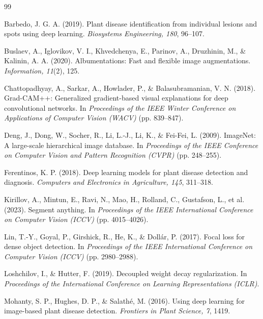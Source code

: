 \documentclass[final,5p,times,twocolumn,authoryear]{elsarticle}
\begin{document}
\begin{thebibliography}{99}

Barbedo, J. G. A. (2019). Plant disease identification from individual lesions and spots using deep learning. \textit{Biosystems Engineering, 180}, 96--107.

Buslaev, A., Iglovikov, V. I., Khvedchenya, E., Parinov, A., Druzhinin, M., \& Kalinin, A. A. (2020). Albumentations: Fast and flexible image augmentations. \textit{Information, 11}(2), 125.

Chattopadhyay, A., Sarkar, A., Howlader, P., \& Balasubramanian, V. N. (2018). Grad-CAM++: Generalized gradient-based visual explanations for deep convolutional networks. In \textit{Proceedings of the IEEE Winter Conference on Applications of Computer Vision (WACV)} (pp. 839--847).

Deng, J., Dong, W., Socher, R., Li, L.-J., Li, K., \& Fei-Fei, L. (2009). ImageNet: A large-scale hierarchical image database. In \textit{Proceedings of the IEEE Conference on Computer Vision and Pattern Recognition (CVPR)} (pp. 248--255).

Ferentinos, K. P. (2018). Deep learning models for plant disease detection and diagnosis. \textit{Computers and Electronics in Agriculture, 145}, 311--318.

Kirillov, A., Mintun, E., Ravi, N., Mao, H., Rolland, C., Gustafson, L., et al. (2023). Segment anything. In \textit{Proceedings of the IEEE International Conference on Computer Vision (ICCV)} (pp. 4015--4026).

Lin, T.-Y., Goyal, P., Girshick, R., He, K., \& Doll\'{a}r, P. (2017). Focal loss for dense object detection. In \textit{Proceedings of the IEEE International Conference on Computer Vision (ICCV)} (pp. 2980--2988).

Loshchilov, I., \& Hutter, F. (2019). Decoupled weight decay regularization. In \textit{Proceedings of the International Conference on Learning Representations (ICLR)}.

Mohanty, S. P., Hughes, D. P., \& Salath\'{e}, M. (2016). Using deep learning for image-based plant disease detection. \textit{Frontiers in Plant Science, 7}, 1419.


\end{thebibliography}
\end{document}

